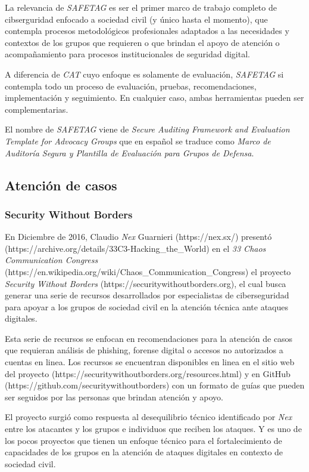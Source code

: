 \documentclass[12pt]{caltech_thesis}
\begin{document}
La relevancia de \textit{SAFETAG} es ser el primer marco de trabajo completo de cibserguridad enfocado a sociedad civil (y único hasta el momento), que contempla procesos metodológicos profesionales adaptados a las necesidades y contextos de los grupos que requieren o que brindan el apoyo de atención o acompañamiento para procesos institucionales de seguridad digital.

A diferencia de \textit{CAT} cuyo enfoque es solamente de evaluación, \textit{SAFETAG} si contempla todo un proceso de evaluación, pruebas, recomendaciones, implementación y seguimiento.  En cualquier caso, ambas herramientas pueden ser complementarias.

El nombre de \textit{SAFETAG} viene de \textit{Secure Auditing Framework and Evaluation Template for Advocacy Groups} que en español se traduce como \textit{Marco de Auditoría Segura y Plantilla de Evaluación para Grupos de Defensa}. 

\subsection{Atención de casos}

\subsubsection{Security Without Borders}

En Diciembre de 2016, Claudio \textit{Nex} Guarnieri (https://nex.sx/) presentó (https://archive.org/details/33C3-Hacking\_the\_World) en el \textit{33 Chaos Communication Congress} (https://en.wikipedia.org/wiki/Chaos\_Communication\_Congress) el proyecto \textit{Security Without Borders} (https://securitywithoutborders.org), el cual busca generar una serie de recursos desarrollados por especialistas de ciberseguridad para apoyar a los grupos de sociedad civil en la atención técnica ante ataques digitales.

Esta serie de recursos se enfocan en recomendaciones para la atención de casos que requieran análisis de phishing, forense digital o accesos no autorizados a cuentas en linea. Los recursos se encuentran disponibles en linea en el sitio web del proyecto (https://securitywithoutborders.org/resources.html) y en GitHub (https://github.com/securitywithoutborders) con un formato de guías que pueden ser seguidos por las personas que brindan atención y apoyo.

El proyecto surgió como respuesta al desequilibrio técnico identificado por \textit{Nex} entre los atacantes y los grupos e individuos que reciben los ataques. Y es uno de los pocos proyectos que tienen un enfoque técnico para el fortalecimiento de capacidades de los grupos en la atención de ataques digitales en contexto de sociedad civil.
\end{document}
